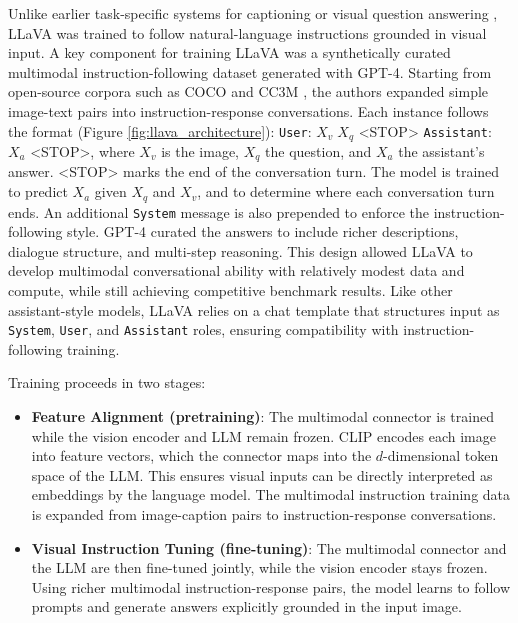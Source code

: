 Unlike earlier task-specific systems for captioning or visual question answering \cite{agrawalVQAVisualQuestion2016, luHierarchicalQuestionImageCoAttention2017, renExploringModelsData2015, xuShowAttendTell2016, vinyalsShowTellNeural2015}, LLaVA was trained to follow natural-language instructions grounded in visual input. A key component  for training LLaVA was a synthetically curated multimodal instruction-following dataset generated with GPT-4. Starting from open-source corpora such as COCO \cite{linMicrosoftCOCOCommon2015} and CC3M \cite{sharmaConceptualCaptionsCleaned2018}, the authors expanded simple image-text pairs into instruction-response conversations. Each instance follows the format (Figure \ref{fig:llava_architecture}):
\texttt{User}: $X_v \; X_q$ <STOP> \texttt{Assistant}: $X_a$ <STOP>,
where $X_v$ is the image, $X_q$ the question, and $X_a$ the assistant's answer. <STOP> marks the end of the conversation turn. The model is trained to predict $X_a$ given $X_q$ and $X_v$, and to determine where each conversation turn ends. An additional \texttt{System} message is also prepended to enforce the instruction-following style. GPT-4 curated the answers to include richer descriptions, dialogue structure, and multi-step reasoning. This design allowed LLaVA to develop multimodal conversational ability with relatively modest data and compute, while still achieving competitive benchmark results. Like other assistant-style models, LLaVA relies on a chat template that structures input as \texttt{System}, \texttt{User}, and \texttt{Assistant} roles, ensuring compatibility with instruction-following training.

Training proceeds in two stages:

\begin{itemize}
\item \textbf{Feature Alignment (pretraining)}: The multimodal connector is trained while the vision encoder and LLM remain frozen. CLIP encodes each image into feature vectors, which the connector maps into the $d$-dimensional token space of the LLM. This ensures visual inputs can be directly interpreted as embeddings by the language model. The multimodal instruction training data is expanded from image-caption pairs to instruction-response conversations.
\item \textbf{Visual Instruction Tuning (fine-tuning)}: The multimodal connector and the LLM are then fine-tuned jointly, while the vision encoder stays frozen. Using richer multimodal instruction-response pairs, the model learns to follow prompts and generate answers explicitly grounded in the input image.
\end{itemize}

